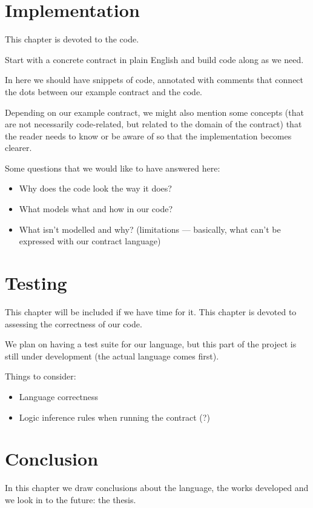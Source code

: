 \documentclass{ituthesis}
\begin{document}
\chapter{Implementation}
This chapter is devoted to the code.\par
Start with a concrete contract in plain English and build code along as we need.\par
In here we should have snippets of code, annotated with comments that connect the dots between our example contract and the code.\par
Depending on our example contract, we might also mention some concepts (that are not necessarily code-related, but related to the domain of the contract) that the reader needs to know or be aware of so that the implementation becomes clearer.\par
Some questions that we would like to have answered here:
\begin{itemize}
    \item Why does the code look the way it does?
    \item What models what and how in our code?
    \item What isn't modelled and why? (limitations --- basically, what can't be expressed with our contract language)
\end{itemize}


\chapter{Testing}
This chapter will be included if we have time for it.
This chapter is devoted to assessing the correctness of our code.\par
We plan on having a test suite for our language, but this part of the project is still under development (the actual language comes first).\par
Things to consider:
\begin{itemize}
    \item Language correctness
    \item Logic inference rules when running the contract (?)
\end{itemize}


\chapter{Conclusion}
In this chapter we draw conclusions about the language, the works developed and we look in to the future: the thesis.





\printbibliography
\end{document}
